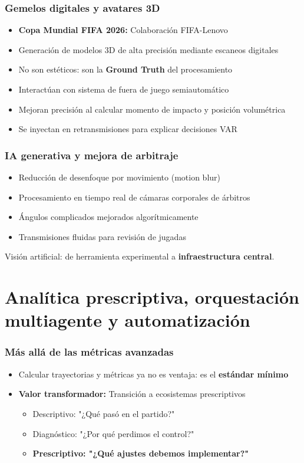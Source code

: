 \documentclass[aspectratio=169]{beamer}
\begin{document}
\begin{frame}\frametitle{Gemelos digitales y avatares 3D}
\begin{itemize}
    \item \textbf{Copa Mundial FIFA 2026:} Colaboración FIFA-Lenovo
    \item Generación de modelos 3D de alta precisión mediante escaneos digitales
    \item No son estéticos: son la \textbf{Ground Truth} del procesamiento
    \item Interactúan con sistema de fuera de juego semiautomático
    \item Mejoran precisión al calcular momento de impacto y posición volumétrica
    \item Se inyectan en retransmisiones para explicar decisiones VAR
\end{itemize}
\end{frame}

\begin{frame}\frametitle{IA generativa y mejora de arbitraje}
\begin{itemize}
    \item Reducción de desenfoque por movimiento (motion blur)
    \item Procesamiento en tiempo real de cámaras corporales de árbitros
    \item Ángulos complicados mejorados algorítmicamente
    \item Transmisiones fluidas para revisión de jugadas
\end{itemize}
Visión artificial: de herramienta experimental a \textbf{infraestructura central}.
\end{frame}

\section{Analítica prescriptiva, orquestación multiagente y automatización}
\frame{\sectionpage}

\begin{frame}\frametitle{Más allá de las métricas avanzadas}
\begin{itemize}
    \item Calcular trayectorias y métricas ya no es ventaja: es el \textbf{estándar mínimo}
    \item \textbf{Valor transformador:} Transición a ecosistemas prescriptivos
    \begin{itemize}
        \item Descriptivo: "¿Qué pasó en el partido?"
        \item Diagnóstico: "¿Por qué perdimos el control?"
        \item \textbf{Prescriptivo: "¿Qué ajustes debemos implementar?"}
    \end{itemize}
\end{itemize}
\end{frame}
\end{document}
